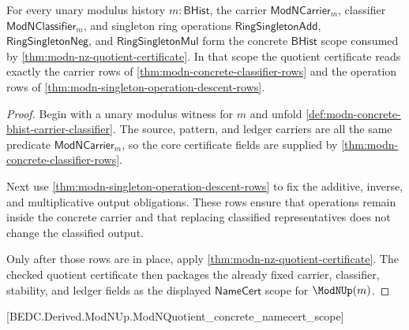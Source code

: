 \begin{theorem}
\label{thm:modn-concrete-namecert-scope}
For every unary modulus history $m:\mathsf{BHist}$, the carrier
$\mathsf{ModNCarrier}_m$, classifier $\mathsf{ModNClassifier}_m$, and singleton
ring operations $\mathsf{RingSingletonAdd}$, $\mathsf{RingSingletonNeg}$, and
$\mathsf{RingSingletonMul}$ form the concrete $\mathsf{BHist}$ scope consumed by
\autoref{thm:modn-nz-quotient-certificate}. In that scope the quotient
certificate reads exactly the carrier rows of
\autoref{thm:modn-concrete-classifier-rows} and the operation rows of
\autoref{thm:modn-singleton-operation-descent-rows}.
\end{theorem}
\begin{proof}
Begin with a unary modulus witness for $m$ and unfold
\autoref{def:modn-concrete-bhist-carrier-classifier}. The source, pattern, and
ledger carriers are all the same predicate $\mathsf{ModNCarrier}_m$, so the
core certificate fields are supplied by
\autoref{thm:modn-concrete-classifier-rows}.

Next use \autoref{thm:modn-singleton-operation-descent-rows} to fix the
additive, inverse, and multiplicative output obligations. These rows ensure
that operations remain inside the concrete carrier and that replacing
classified representatives does not change the classified output.

Only after those rows are in place, apply
\autoref{thm:modn-nz-quotient-certificate}. The checked quotient certificate
then packages the already fixed carrier, classifier, stability, and ledger
fields as the displayed $\mathsf{NameCert}$ scope for $\ModNUp(m)$.
\end{proof}

[BEDC.Derived.ModNUp.ModNQuotient\_concrete\_namecert\_scope]


